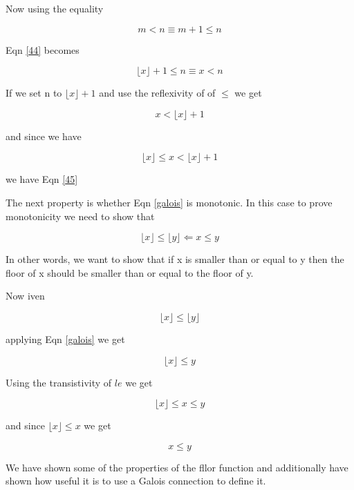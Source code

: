 \documentclass[10pt,a4paper]{article}
\providecommand{\floor}[1]{\lfloor #1 \rfloor  }
\begin{document}
Now using the equality

\begin{equation}
 m <n \equiv m+1 \le n
\end{equation}

Eqn \ref{44} becomes

\begin{equation}
 \floor{x} +1 \le n \equiv x < n
\end{equation}

If we set n to $\floor{x} +1$ and use the reflexivity of  of $\le$ we get

\begin{equation}
x < \floor{x} +1
\end{equation}

and since we have 

\begin{equation}
 \floor{x} \le x < \floor{x} + 1
\end{equation}

we have Eqn \ref{45}


The next property is whether Eqn \ref{galois} is monotonic. In this case to prove monotonicity we need to show that

\begin{equation}
 \floor{x} \le \floor{y} \Leftarrow x \le y
\end{equation}

In other words, we want to show that if x is smaller than or equal to y then the floor of x should be smaller than or equal to the floor of y.

Now iven

\begin{equation}
 \floor{x} \le \floor{y}
\end{equation}

applying Eqn \ref{galois} we get

\begin{equation}
 \floor{x} \le y
\end{equation}

Using the transistivity of $le$ we get

\begin{equation}
 \floor{x}\le x\le y
\end{equation}

and since $\floor{x} \le x$ we get

\begin{equation}
 x\le y
\end{equation}

We have shown some of the properties of the fllor function and additionally have shown how useful it is to use a Galois connection to define it.
\end{document}
